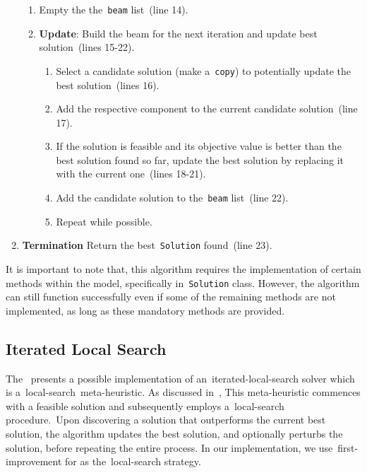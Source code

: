 \begin{enumerate}
\begin{enumerate}
          \item Empty the the~\texttt{beam} list~(line 14).
          \item \textbf{Update}: Build the beam for the next iteration and update best solution~(lines 15-22).
                \begin{enumerate}
                  \item Select a candidate solution (make a~\texttt{copy}) to
                        potentially update the best solution~(lines 16).
                  \item Add the respective component to the current candidate solution~(line 17).
                  \item If the solution is feasible and its objective value is better than
                        the best solution found so far, update the best solution by replacing
                        it with the current one~(lines 18-21).
                  \item Add the candidate solution to the~\texttt{beam} list~(line 22).
                  \item Repeat while possible.
                \end{enumerate}
        \end{enumerate}
  \item \textbf{Termination} Return the best~\texttt{Solution} found~(line 23).
\end{enumerate}

It is important to note that, this algorithm requires the implementation of
certain methods within the model, specifically in~\texttt{Solution} class.
However, the algorithm can still function successfully even if some of the
remaining methods are not implemented, as long as these mandatory methods are
provided.

\subsection{Iterated Local Search}
\label{subsec:ils}

The~ presents a possible implementation of
an~\acrshort{iterated-local-search} solver which is
a~\acrshort{local-search}~\acrshort{meta-heuristic}. As discussed
in~, This meta-heuristic commences with a feasible solution
and subsequently employs a~\acrshort{local-search} procedure.~Upon discovering a
solution that outperforms the current best solution, the algorithm updates the
best solution, and optionally perturbs the solution, before repeating the entire
process. In our implementation, we use~\acrshort{first-improvement} for
as the~\acrshort{local-search} strategy.

